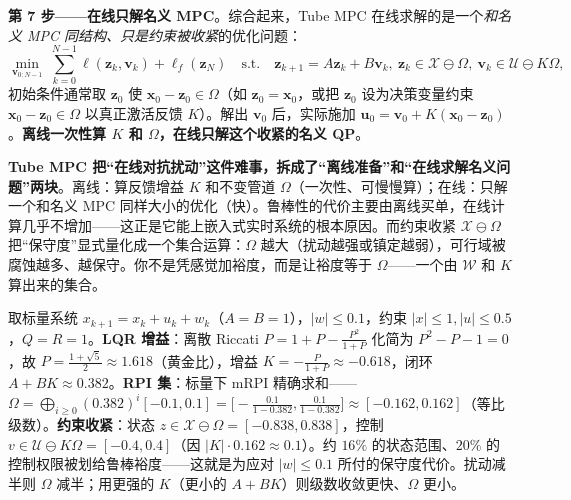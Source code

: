 \textbf{第 7 步——在线只解名义 MPC}。综合起来，Tube MPC 在线求解的是一个\emph{和名义 MPC 同结构、只是约束被收紧}的优化问题：
\begin{equation}
  \min_{\mathbf{v}_{0:N-1}}\ \sum_{k=0}^{N-1}\ell(\mathbf{z}_k,\mathbf{v}_k)+\ell_f(\mathbf{z}_N)\quad\text{s.t.}\quad \mathbf{z}_{k+1}=A\mathbf{z}_k+B\mathbf{v}_k,\ \mathbf{z}_k\in\mathcal{X}\ominus\Omega,\ \mathbf{v}_k\in\mathcal{U}\ominus K\Omega,
  \label{eq:pr-tube-online}
\end{equation}
初始条件通常取 $\mathbf{z}_0$ 使 $\mathbf{x}_0-\mathbf{z}_0\in\Omega$（如 $\mathbf{z}_0=\mathbf{x}_0$，或把 $\mathbf{z}_0$ 设为决策变量约束 $\mathbf{x}_0-\mathbf{z}_0\in\Omega$ 以真正激活反馈 $K$）。解出 $\mathbf{v}_0$ 后，实际施加 $\mathbf{u}_0=\mathbf{v}_0+K(\mathbf{x}_0-\mathbf{z}_0)$。\textbf{离线一次性算 $K$ 和 $\Omega$，在线只解这个收紧的名义 QP}。

\begin{insight}
\textbf{Tube MPC 把“在线对抗扰动”这件难事，拆成了“离线准备”和“在线求解名义问题”两块}。离线：算反馈增益 $K$ 和不变管道 $\Omega$（一次性、可慢慢算）；在线：只解一个和名义 MPC 同样大小的优化（快）。鲁棒性的代价主要由离线买单，在线计算几乎不增加——这正是它能上嵌入式实时系统的根本原因。而约束收紧 $\mathcal{X}\ominus\Omega$ 把“保守度”显式量化成一个集合运算：$\Omega$ 越大（扰动越强或镇定越弱），可行域被腐蚀越多、越保守。你不是凭感觉加裕度，而是让裕度等于 $\Omega$——一个由 $\mathcal{W}$ 和 $K$ 算出来的集合。
\end{insight}

\begin{derivation}\label{der:pr-tube-scalar}
取标量系统 $x_{k+1}=x_k+u_k+w_k$（$A=B=1$），$|w|\le0.1$，约束 $|x|\le1,|u|\le0.5$，$Q=R=1$。\textbf{LQR 增益}：离散 Riccati $P=1+P-\frac{P^2}{1+P}$ 化简为 $P^2-P-1=0$，故 $P=\frac{1+\sqrt5}{2}\approx1.618$（黄金比），增益 $K=-\frac{P}{1+P}\approx-0.618$，闭环 $A+BK\approx0.382$。\textbf{RPI 集}：标量下 mRPI 精确求和——$\Omega=\bigoplus_{i\ge0}(0.382)^i[-0.1,0.1]=\big[-\frac{0.1}{1-0.382},\frac{0.1}{1-0.382}\big]\approx[-0.162,0.162]$（等比级数）。\textbf{约束收紧}：状态 $z\in\mathcal{X}\ominus\Omega=[-0.838,0.838]$，控制 $v\in\mathcal{U}\ominus K\Omega=[-0.4,0.4]$（因 $|K|\cdot0.162\approx0.1$）。约 $16\%$ 的状态范围、$20\%$ 的控制权限被划给鲁棒裕度——这就是为应对 $|w|\le0.1$ 所付的保守度代价。扰动减半则 $\Omega$ 减半；用更强的 $K$（更小的 $A+BK$）则级数收敛更快、$\Omega$ 更小。
\end{derivation}

